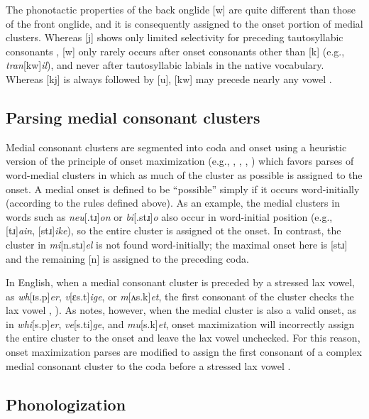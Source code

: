 \documentclass[12pt]{article}
\begin{document}
The phonotactic properties of the back onglide [w] are quite different than those of the front onglide, and it is consequently assigned to the onset portion of medial clusters. Whereas [j] shows only limited selectivity for preceding tautosyllabic consonants \citep{Kaye1996}, [w] only rarely occurs after onset consonants other than [k] (e.g., \emph{tran}[kw]\emph{il}), and never after tautosyllabic labials in the native vocabulary. Whereas [kj] is always followed by [u], [kw] may precede nearly any vowel \citep[161]{Davis1995}.

\subsection{Parsing medial consonant clusters}

Medial consonant clusters are segmented into coda and onset using a heuristic version of the principle of onset maximization (e.g., \citealp[42f.]{Kahn1976}, \citealp{Kurylowicz1948}, \citealp[75]{Pulgram1970}, \citealp[][358f.]{Selkirk1982b}) which favors parses of word-medial clusters in which as much of the cluster as possible is assigned to the onset. A medial onset is defined to be ``possible'' simply if it occurs word-initially (according to the rules defined above). As an example, the medial clusters in words such as \emph{neu}[.tɹ]\emph{on} or \emph{bi}[.stɹ]\emph{o} also occur in word-initial position (e.g., [tɹ]\emph{ain}, [stɹ]\emph{ike}), so the entire cluster is assigned ot the onset. In contrast, the cluster in \emph{mi}[n.stɹ]\emph{el} is not found word-initially; the maximal onset here is [stɹ] and the remaining [n] is assigned to the preceding coda.

In English, when a medial consonant cluster is preceded by a stressed lax vowel, as \emph{wh}[ɪs.p]\emph{er}, \emph{v}[ɛs.t]\emph{ige}, or \emph{m}[ʌs.k]\emph{et}, the first consonant of the cluster checks the lax vowel \citep[3]{Hammond1997}, \citet{Treiman1990}). As \citet[55]{Harris1994} notes, however, when the medial cluster is also a valid onset, as in \emph{whi}[s.p]\emph{er}, \emph{ve}[s.ti]\emph{ge}, and \emph{mu}[s.k]\emph{et}, onset maximization will incorrectly assign the entire cluster to the onset and leave the lax vowel unchecked. For this reason, onset maximization parses are modified to assign the first consonant of a complex medial consonant cluster to the coda before a stressed lax vowel \citep[48]{Pulgram1970}.

\subsection{Phonologization}
\end{document}

